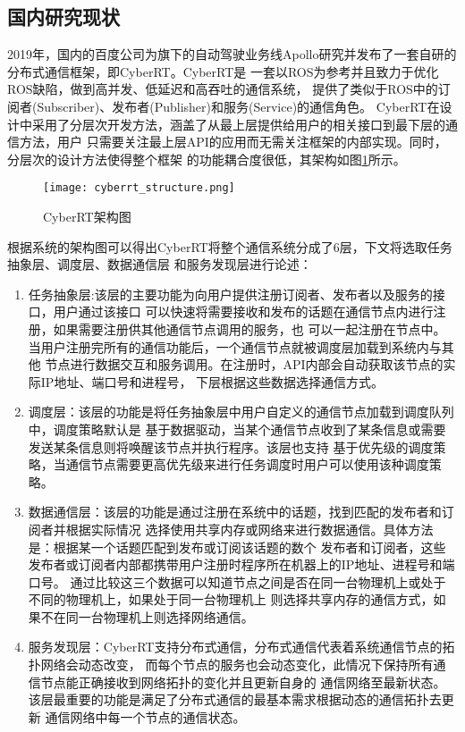 \subsection{国内研究现状}
2019年，国内的百度公司为旗下的自动驾驶业务线Apollo研究并发布了一套自研的分布式通信框架，即CyberRT。CyberRT是
一套以ROS为参考并且致力于优化ROS缺陷，做到高并发、低延迟和高吞吐的通信系统，
提供了类似于ROS中的订阅者(Subscriber)、发布者(Publisher)和服务(Service)的通信角色。
CyberRT在设计中采用了分层次开发方法，涵盖了从最上层提供给用户的相关接口到最下层的通信方法，用户
只需要关注最上层API的应用而无需关注框架的内部实现。同时，分层次的设计方法使得整个框架
的功能耦合度很低，其架构如图\ref{cyberrt_structure}所示\cite{cyberrt}。
\begin{figure}[H]
  \centering
  \texttt{[image: cyberrt\_structure.png]}
  \caption{CyberRT架构图}
  \label{cyberrt_structure}
\end{figure}
根据系统的架构图可以得出CyberRT将整个通信系统分成了6层，下文将选取任务抽象层、调度层、数据通信层
和服务发现层进行论述：
\begin{enumerate}
  \item 任务抽象层:该层的主要功能为向用户提供注册订阅者、发布者以及服务的接口，用户通过该接口
  可以快速将需要接收和发布的话题在通信节点内进行注册，如果需要注册供其他通信节点调用的服务，也
  可以一起注册在节点中。当用户注册完所有的通信功能后，一个通信节点就被调度层加载到系统内与其他
  节点进行数据交互和服务调用。在注册时，API内部会自动获取该节点的实际IP地址、端口号和进程号，
  下层根据这些数据选择通信方式。
  \item 调度层：该层的功能是将任务抽象层中用户自定义的通信节点加载到调度队列中，调度策略默认是
  基于数据驱动，当某个通信节点收到了某条信息或需要发送某条信息则将唤醒该节点并执行程序。该层也支持
  基于优先级的调度策略，当通信节点需要更高优先级来进行任务调度时用户可以使用该种调度策略。
  \item 数据通信层：该层的功能是通过注册在系统中的话题，找到匹配的发布者和订阅者并根据实际情况
  选择使用共享内存或网络来进行数据通信。具体方法是：根据某一个话题匹配到发布或订阅该话题的数个
  发布者和订阅者，这些发布者或订阅者内部都携带用户注册时程序所在机器上的IP地址、进程号和端口号。
  通过比较这三个数据可以知道节点之间是否在同一台物理机上或处于不同的物理机上，如果处于同一台物理机上
  则选择共享内存的通信方式，如果不在同一台物理机上则选择网络通信。
  \item 服务发现层：CyberRT支持分布式通信，分布式通信代表着系统通信节点的拓扑网络会动态改变，
  而每个节点的服务也会动态变化，此情况下保持所有通信节点能正确接收到网络拓扑的变化并且更新自身的
  通信网络至最新状态。该层最重要的功能是满足了分布式通信的最基本需求根据动态的通信拓扑去更新
  通信网络中每一个节点的通信状态。
\end{enumerate}
